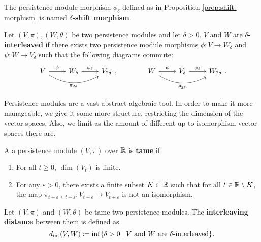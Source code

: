 \begin{definition}
    The persistence module morphism $ \phi_\delta $ defined as in Proposition \ref{prop:shift-morphism} is named {\bf $\delta$-shift morphism}.
\end{definition}

\begin{definition}
    Let $ (V, \pi), (W, \theta) $ be two persistence modules and let $ \delta > 0 $. $ V $ and $ W $ are {\bf $\delta$-interleaved } if there exists two persistence module morphisms $ \phi \colon V \to W_\delta $ and $ \psi \colon W \to V_\delta $ such that the following diagrams commute:
    $$
    \begin{array}{ccc}
    \begin{tikzcd}
        V \arrow[r, "\phi"] \arrow[rr, "\pi_{2\delta}"', bend right] & W_\delta \arrow[r, "\psi_\delta"] & V_{2\delta}
    \end{tikzcd},
    &
    \quad \quad
    &
    \begin{tikzcd}
        W \arrow[r, "\psi"] \arrow[rr, "\theta_{2\delta}"', bend right] & V_\delta \arrow[r, "\phi_\delta"] & W_{2\delta}
    \end{tikzcd}.
    \end{array}
    $$
\end{definition}

Persistence modules are a vast abstract algebraic tool. In order to make it more manageable, we give it some more structure, restricting the dimension of the vector spaces, Also, we limit as the amount of different up to isomorphism vector spaces there are.

\begin{definition}
    A a persistence module $ (V, \pi) $ over $ \mathbb R $ is {\bf tame} if
    \begin{enumerate}
        \renewcommand{\labelenumi}{(\roman{enumi})}
        \item For all $ t \geq 0 $, $ \dim(V_t) $ is finite.
        \item For any $\varepsilon > 0 $, there exists a finite subset $ K \subset \mathbb R $ such that for all $ t \in \mathbb R \setminus K $, the map $ \pi_{t-\varepsilon \leq t+\varepsilon} \colon V_{t-\varepsilon} \to V_{t+\varepsilon} $ is not an isomorphism.
    \end{enumerate}
\end{definition}

\begin{definition}
    Let $ (V, \pi) $ and $ (W, \theta) $ be tame two persistence modules. The {\bf interleaving distance} between them is defined as
    $$
        d_{\operatorname{int}}(V, W) \coloneq \inf \{ \delta > 0 \mid V \text{ and } W \text{ are } \delta\text{-interleaved}\}.
    $$
\end{definition}

